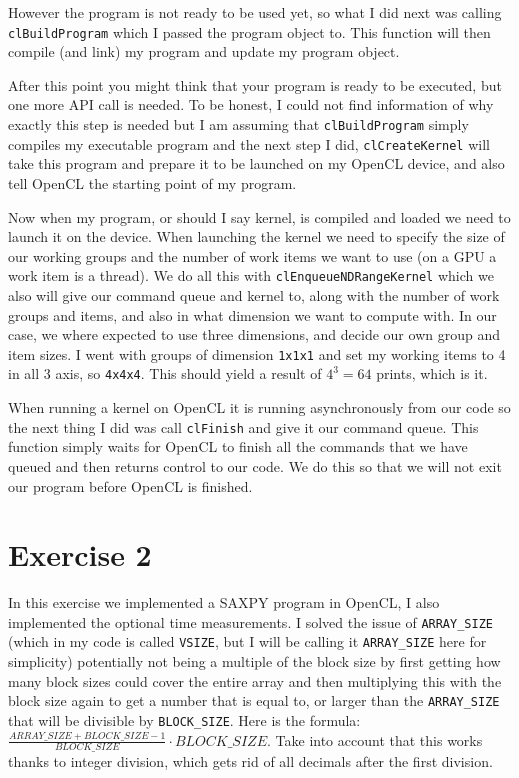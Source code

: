 \documentclass[a4paper, 12pt]{article}
\def\code#1{\texttt{#1}}
\begin{document}
However the program is not ready to be used yet, so what I did next was calling \code{clBuildProgram} which I passed the program object to. This function will then compile (and link) my program and update my program object.

After this point you might think that your program is ready to be executed, but one more API call is needed. To be honest, I could not find information of why exactly this step is needed but I am assuming that \code{clBuildProgram} simply compiles my executable program and the next step I did, \code{clCreateKernel} will take this program and prepare it to be launched on my OpenCL device, and also tell OpenCL the starting point of my program.

Now when my program, or should I say kernel, is compiled and loaded we need to launch it on the device. When launching the kernel we need to specify the size of our working groups and the number of work items we want to use (on a GPU a work item is a thread). We do all this with \code{clEnqueueNDRangeKernel} which we also will give our command queue and kernel to, along with the number of work groups and items, and also in what dimension we want to compute with. In our case, we where expected to use three dimensions, and decide our own group and item sizes. I went with groups of dimension \code{1x1x1} and set my working items to 4 in all 3 axis, so \code{4x4x4}. This should yield a result of $4^3 = 64$ prints, which is it.

When running a kernel on OpenCL it is running asynchronously from our code so the next thing I did was call \code{clFinish} and give it our command queue. This function simply waits for OpenCL to finish all the commands that we have queued and then returns control to our code. We do this so that we will not exit our program before OpenCL is finished.

\section{Exercise 2}
In this exercise we implemented a SAXPY program in OpenCL, I also implemented the optional time measurements. I solved the issue of \code{ARRAY\_SIZE} (which in my code is called \code{VSIZE}, but I will be calling it \code{ARRAY\_SIZE} here for simplicity) potentially not being a multiple of the block size by first getting how many block sizes could cover the entire array and then multiplying this with the block size again to get a number that is equal to, or larger than the \code{ARRAY\_SIZE} that will be divisible by \code{BLOCK\_SIZE}. Here is the formula: $\frac{ARRAY\_SIZE + BLOCK\_SIZE - 1}{BLOCK\_SIZE} \cdot BLOCK\_SIZE$. Take into account that this works thanks to integer division, which gets rid of all decimals after the first division.
\end{document}

